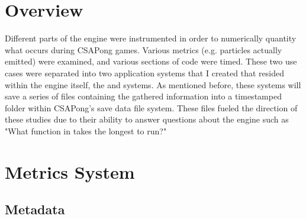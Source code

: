 

\section{Overview}\label{sec:instr_overview}

Different parts of the engine were instrumented in order to numerically quantity what occurs during CSAPong games. Various metrics (e.g. particles actually emitted) were examined, and various sections of code were timed. These two use cases were separated into two application systems that I created that resided within the engine itself, the  and  systems. As mentioned before, these systems will save a series of files containing the gathered information into a timestamped folder within CSAPong's save data file system. These files fueled the direction of these studies due to their ability to answer questions about the engine such as "What function in  takes the longest to run?"

\section{Metrics System}\label{sec:instr_metrics_system}

\subsection{Metadata}\label{ssec:instr_metrics_system_metadata}

